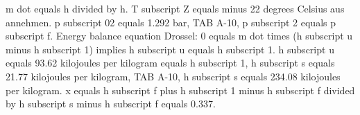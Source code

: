 m dot equals h divided by h.
T subscript Z equals minus 22 degrees Celsius aus annehmen.
p subscript 02 equals 1.292 bar, TAB A-10, p subscript 2 equals p subscript f.
Energy balance equation Drossel: 0 equals m dot times (h subscript u minus h subscript 1) implies h subscript u equals h subscript 1.
h subscript u equals 93.62 kilojoules per kilogram equals h subscript 1, h subscript s equals 21.77 kilojoules per kilogram, TAB A-10, h subscript s equals 234.08 kilojoules per kilogram.
x equals h subscript f plus h subscript 1 minus h subscript f divided by h subscript s minus h subscript f equals 0.337.